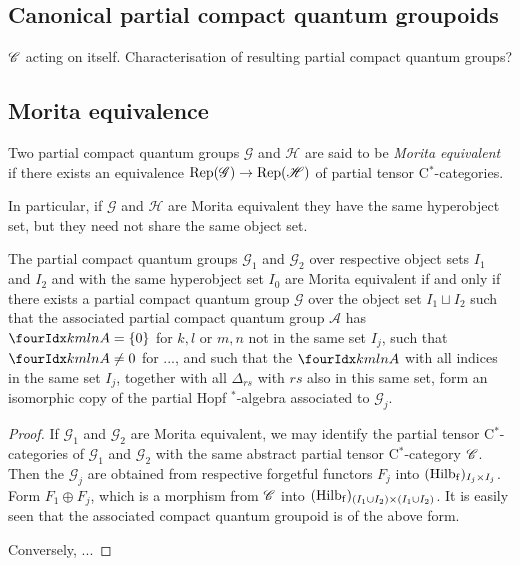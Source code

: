 
\subsection{Canonical partial compact quantum groupoids}

$\mathscr{C}$ acting on itself. Characterisation of resulting partial compact quantum groups? 

\subsection{Morita equivalence}


\begin{Def} Two partial compact quantum groups $\mathscr{G}$ and $\mathscr{H}$ are said to be \emph{Morita equivalent} if there exists an equivalence $\mathrm{Rep}(\mathscr{G}) \rightarrow \mathrm{Rep}(\mathscr{H})$ of partial tensor C$^*$-categories. %
\end{Def} 

In particular, if $\mathscr{G}$ and $\mathscr{H}$ are Morita equivalent they have the same hyperobject set, but they need not share the same object set.

\begin{Prop} The partial compact quantum groups $\mathscr{G}_1$ and $\mathscr{G}_2$ over respective object sets $I_1$ and $I_2$ and with the same hyperobject set $I_0$ are Morita equivalent if and only if there exists a partial compact quantum group $\mathscr{G}$ over the object set $I_1\sqcup I_2$ such that the associated partial compact quantum group $\mathscr{A}$ has $\Gr{A}{k}{l}{m}{n}=\{0\}$ for $k,l$ or $m,n$ not in the same set $I_j$, such that $\Gr{A}{k}{l}{m}{n}\neq 0$ for ..., and such that the $\Gr{A}{k}{l}{m}{n}$ with all indices in the same set $I_j$, together with all $\Delta_{rs}$ with $rs$ also in this same set, form an isomorphic copy of the partial Hopf $^*$-algebra associated to $\mathscr{G}_j$. %
\end{Prop}
\begin{proof} If $\mathscr{G}_1$ and $\mathscr{G}_2$ are Morita equivalent, we may identify the partial tensor C$^*$-categories of $\mathscr{G}_1$ and $\mathscr{G}_2$ with the same abstract partial tensor C$^*$-category $\mathscr{C}$. Then the $\mathscr{G}_j$ are obtained from respective forgetful functors $F_j$ into $(\mathrm{Hilb}_{\operatorname{\mathrm{f}}})_{I_j\times I_j}$. Form $F_1\oplus F_j$, which is a morphism from $\mathscr{C}$ into $(\mathrm{Hilb}_{\operatorname{\mathrm{f}}})_{(I_1\cup I_2)\times (I_1\cup I_2)}$. It is easily seen that the associated compact quantum groupoid is of the above form.

Conversely, ...
\end{proof} 

